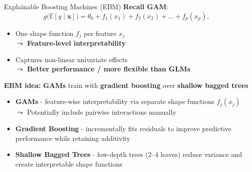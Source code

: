 \documentclass[10pt,compress,t,notes=noshow, xcolor=table]{beamer}
\begin{document}
\begin{frame}{Explainable Boosting Machines (EBM)}
\textbf{Recall GAM}: 
$$
g\big(\mathbb{E}[y \mid \mathbf{x}]\big) = \theta_0 + f_1(x_{1}) + f_2(x_{2}) + \ldots + f_p(x_{p}),
$$

\begin{itemize}
    \item One shape function $f_j$ per feature $x_j$\\ $\leadsto$ \textbf{Feature-level interpretability}
    \item Captures non-linear univariate effects\\ $\leadsto$ \textbf{Better performance / more flexible than GLMs}
\end{itemize}

\medskip

\textbf{EBM idea:} \textbf{GAMs} train with \textbf{gradient boosting} over \textbf{shallow bagged trees}
\begin{itemize}
    \item \textbf{GAMs} - feature-wise interpretability via separate shape functions $f_j(x_j)$\\
    $\leadsto$ Potentially include pairwise interactions manually
    \item \textbf{Gradient Boosting} - incrementally fits residuals to improve predictive performance while retaining additivity
    \item \textbf{Shallow Bagged Trees} - low-depth trees (2–4 leaves) reduce variance and create interpretable shape functions
\end{itemize}



\end{frame}
\end{document}
